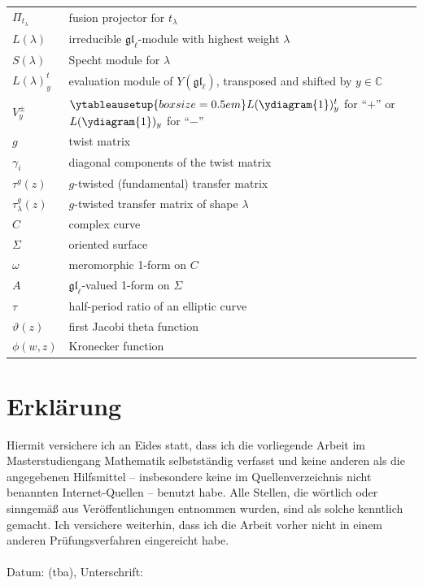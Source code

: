 \documentclass[11pt]{report}
\theoremstyle{definition}
\theoremstyle{remark}
\theoremstyle{remark}
\newcommand{\C}{\mathbb{C}}
\begin{document}
\begin{tabular}{l|l}
$\Pi_{t_\lambda}$ & fusion projector for $t_\lambda$ \\
$L(\lambda)$ & irreducible $\mathfrak{gl}_\ell$-module with highest weight $\lambda$ \\
$S(\lambda)$ & Specht module for $\lambda$ \\
$L(\lambda)_y^t$ & evaluation module of $Y(\mathfrak{gl}_\ell)$, transposed and shifted by $y \in \C$ \\
$V_y^\pm$ & $\ytableausetup{boxsize=0.5em}L(\ydiagram{1})_y^t$ for “$+$” or $L(\ydiagram{1})_y$ for “$-$” \\
$g$ & twist matrix \\
$\gamma_i$ & diagonal components of the twist matrix \\
$\tau^g(z)$ & $g$-twisted (fundamental) transfer matrix \\
$\tau_\lambda^g(z)$ & $g$-twisted transfer matrix of shape $\lambda$ \\
$C$ & complex curve \\
$\Sigma$ & oriented surface \\
$\omega$ & meromorphic 1-form on $C$ \\
$A$ & $\mathfrak{gl}_\ell$-valued 1-form on $\Sigma$ \\
$\tau$ & half-period ratio of an elliptic curve \\
$\vartheta(z)$ & first Jacobi theta function \\
$\phi(w,z)$ & Kronecker function
\end{tabular}

\pagebreak

\printindex




\pagebreak

\section*{Erklärung}

Hiermit versichere ich an Eides statt, dass ich die vorliegende Arbeit im Masterstudiengang Mathematik selbstständig verfasst und keine anderen als die angegebenen Hilfsmittel – insbesondere keine im Quellenverzeichnis nicht benannten Internet-Quellen – benutzt habe. Alle Stellen, die wörtlich oder sinngemäß aus Veröffentlichungen entnommen wurden, sind als solche kenntlich gemacht. Ich versichere weiterhin, dass ich die Arbeit vorher nicht in einem anderen Prüfungsverfahren eingereicht habe.
~\\~\\
Datum: (tba), Unterschrift:

\end{document}
